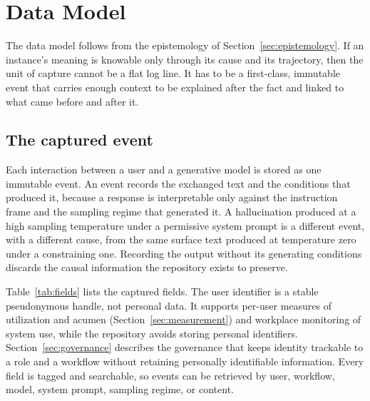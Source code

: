 \documentclass[11pt]{article}
\begin{document}
\section{Data Model}
\label{sec:datamodel}

The data model follows from the epistemology of Section~\ref{sec:epistemology}.
If an instance's meaning is knowable only through its cause and its trajectory,
then the unit of capture cannot be a flat log line. It has to be a first-class,
immutable event that carries enough context to be explained after the fact and
linked to what came before and after it.

\subsection{The captured event}

Each interaction between a user and a generative model is stored as one
immutable event. An event records the exchanged text and the conditions that
produced it, because a response is interpretable only against the instruction
frame and the sampling regime that generated it. A hallucination produced at a
high sampling temperature under a permissive system prompt is a different event,
with a different cause, from the same surface text produced at temperature zero
under a constraining one. Recording the output without its generating conditions
discards the causal information the repository exists to preserve.

Table~\ref{tab:fields} lists the captured fields. The user identifier is a
stable pseudonymous handle, not personal data. It supports per-user measures of
utilization and acumen (Section~\ref{sec:measurement}) and workplace monitoring
of system use, while the repository avoids storing personal identifiers.
Section~\ref{sec:governance} describes the governance that keeps identity
trackable to a role and a workflow without retaining personally identifiable
information. Every field is tagged and searchable, so events can be retrieved by
user, workflow, model, system prompt, sampling regime, or content.
\end{document}

